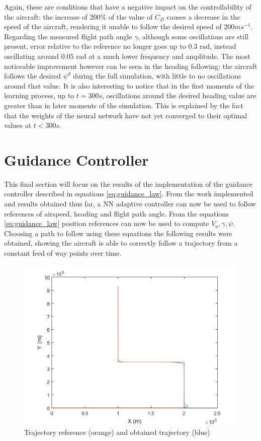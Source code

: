 Again, these are conditions that have a negative impact on the controllability of the aircraft: the increase of 200\% of the value of $C_D$ causes a decrease in the speed of the aircraft, rendering it unable to follow the desired speed of $200ms^{-1}$. Regarding the measured flight path angle $\gamma$, although  some oscillations are still present, error relative to the reference no longer goes up to $0.3\text{ rad}$, instead oscillating around $0.05\text{ rad}$ at a much lower frequency and amplitude. The most noticeable improvement however can be seen in the heading following: the aircraft follows the desired $\psi^d$ during the full simulation, with little to no oscillations around that value. It is also interesting to notice that in the first moments of the learning process, up to $t=300s$, oscillations around the desired heading value are greater than in later moments of the simulation. This is explained by the fact that the weights of the neural network have not yet converged to their optimal values at $t<300s$.


\section{Guidance Controller}
\label{section:results/guidance_control}

This final section will focus on the results of the implementation of the guidance controller described in equations \ref{eq:guidance_law}. From the work implemented and results obtained thus far, a NN adaptive controller can now be used to follow references of airspeed, heading and flight path angle. From the equations \ref{eq:guidance_law} position references can now be used to compute $V_a,\gamma, \psi$. Choosing a path to follow using these equations the following results were obtained, showing the aircraft is able to correctly follow a trajectory from a constant feed of way points over time.

\begin{figure}[H]
\centering
\includegraphics[width=1\textwidth]{Figures/Results/guidance.png}
\caption[Trajectory following with guidance controller]{Trajectory reference (orange) and obtained trajectory (blue)}
\label{fig:guidance}
\end{figure}



